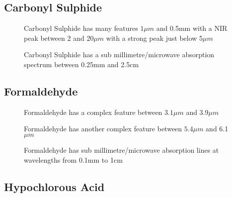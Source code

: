 \documentclass[12pt]{article}
\begin{document}
\subsection{Carbonyl Sulphide}

\vspace*{11.5cm}
\begin{figure}[htb]
\caption{Carbonyl Sulphide has many features  $1\mu m$
 and  0.5mm with a NIR peak between 2 and 20$\mu m$ with a strong peak
just below 5$\mu m$}
\end{figure}
\newpage


\vspace*{11.5cm}
\begin{figure}[htb]
\caption{Carbonyl Sulphide has a sub millimetre/microwave absorption spectrum
 between 0.25mm and 2.5cm}
\end{figure}
\newpage

\subsection{Formaldehyde}

\vspace*{11.5cm}
\begin{figure}[htb]
\caption{Formaldehyde has a complex feature between   $3.1\mu m$
 and 3.9$\mu m$}
\end{figure}
\newpage


\vspace*{11.5cm}
\begin{figure}[htb]
\caption{Formaldehyde has another complex feature between   $5.4\mu m$
 and 6.1$\mu m$}
\end{figure}
\newpage


\vspace*{11.5cm}
\begin{figure}[htb]
\caption{Formaldehyde has sub millimetre/microwave absorption lines at wavelengths
 from  0.1mm to 1cm}
\end{figure}
\newpage

\subsection{Hypochlorous Acid}
\end{document}
